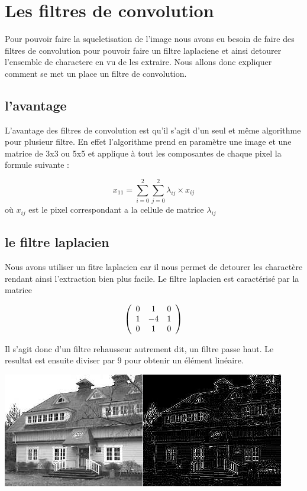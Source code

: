 \section{Les filtres de convolution}
Pour pouvoir faire la squeletisation de l'image nous avons eu besoin de faire des filtres de convolution pour pouvoir faire un filtre laplaciene et ainsi detourer l'ensemble de charactere en vu de les extraire. Nous allons donc expliquer comment se met un place un filtre de convolution.
\subsection{l'avantage}
L'avantage des filtres de convolution est qu'il s'agit d'un seul et même algorithme pour plusieur filtre. En effet l'algorithme prend en paramètre une image et une matrice de 3x3 ou 5x5 et applique à tout les composantes de chaque pixel la formule suivante :
\begin{center}
\[x_{11} = \sum_{i=0}^2\sum_{j=0}^2 \lambda_{ij} \times x_{ij}\]
où $x_{ij}$ est le pixel correspondant a la cellule de matrice $\lambda_{ij}$
\end{center}
\subsection{le filtre laplacien}
Nous avons utiliser un fitre laplacien car il nous permet de detourer les charactère rendant ainsi l'extraction bien plus facile.
Le filtre laplacien est caractérisé par la matrice 
\begin{center}
\[ \left(
  \begin{array}{ c c c }
     0 & 1  & 0\\
     1 & -4 & 1\\
     0 & 1  & 0
  \end{array} \right)
\]
\end{center}
Il s'agit donc d'un filtre rehausseur autrement dit, un filtre passe haut.
Le resultat est ensuite diviser par 9 pour obtenir un élément linéaire.
\begin{center}
\includegraphics{conv-laplacian-result.png}
\end{center}
